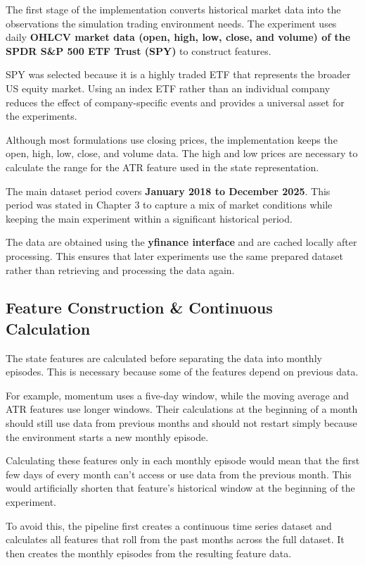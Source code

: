 The first stage of the implementation converts historical market data
into the observations the simulation trading environment needs. The
experiment uses daily \textbf{OHLCV market data (open, high, low, close,
and volume) of the SPDR S\&P 500 ETF Trust (SPY)} to construct features.

SPY was selected because it is a highly traded ETF that represents the
broader US equity market. Using an index ETF rather than an individual
company reduces the effect of company-specific events and provides a
universal asset for the experiments.

Although most formulations use closing prices, the implementation keeps
the open, high, low, close, and volume data. The high and low prices are
necessary to calculate the range for the ATR feature used in the state
representation.

The main dataset period covers \textbf{January 2018 to December 2025}.
This period was stated in Chapter 3 to capture a mix of market
conditions while keeping the main experiment within a significant
historical period.

The data are obtained using the \textbf{yfinance interface} and are
cached locally after processing. This ensures that later experiments use
the same prepared dataset rather than retrieving and processing the data
again.

\subsection{Feature Construction \& Continuous Calculation}

The state features are calculated before separating the data into
monthly episodes. This is necessary because some of the features depend
on previous data.

For example, momentum uses a five-day window, while the moving average
and ATR features use longer windows. Their calculations at the beginning
of a month should still use data from previous months and should not
restart simply because the environment starts a new monthly episode.

Calculating these features only in each monthly episode would mean that
the first few days of every month can't access or use data from the
previous month. This would artificially shorten that feature's
historical window at the beginning of the experiment.

To avoid this, the pipeline first creates a continuous time series
dataset and calculates all features that roll from the past months
across the full dataset. It then creates the monthly episodes from the
resulting feature data.

